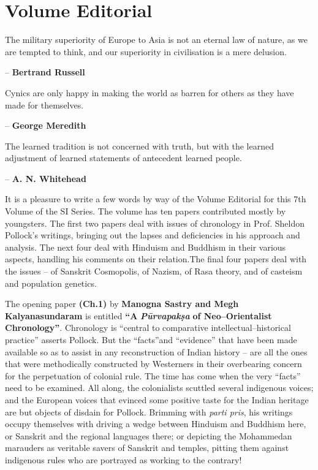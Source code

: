 
\chapter*{Volume Editorial}\label{volumeeditorial}

The military superiority of Europe to Asia is not an eternal law of nature, as we are tempted to think, and our superiority in civilisation is a mere delusion.

\begin{flushright}
– \textbf{Bertrand Russell}
\end{flushright}

Cynics are only happy in making the world as barren for others as they have made for themselves.

\begin{flushright}
– \textbf{George Meredith}
\end{flushright}

The learned tradition is not concerned with truth, but with the learned adjustment of learned statements of antecedent learned people.

\begin{flushright}
– \textbf{A. N. Whitehead}
\end{flushright}

It is a pleasure to write a few words by way of the Volume Editorial for this 7th Volume of the SI Series. The volume has ten papers contributed mostly by youngsters. The first two papers deal with issues of chronology in Prof. Sheldon Pollock’s writings, bringing out the lapses and deficiencies in his approach and analysis. The next four deal with Hinduism and Buddhism in their various aspects, handling his comments on their relation.The final four papers deal with the issues – of Sanskrit Cosmopolis, of Nazism, of Rasa theory, and of casteism and population genetics.

The opening paper \textbf{(Ch.1)} by \textbf{Manogna Sastry and Megh Kalyanasundaram} is entitled \textbf{“A} \textit{\textbf{Pūrvapakṣa}}\textbf{ of Neo–Orientalist Chronology”}. Chronology is “central to comparative intellectual–historical practice” asserts Pollock. But the “facts”and “evidence” that have been made available so as to assist in any reconstruction of Indian history – are all the ones that were methodically constructed by Westerners in their overbearing concern for the perpetuation of colonial rule. The time has come when the very “facts” need to be examined. All along, the colonialists scuttled several indigenous voices; and the European voices that evinced some positive taste for the Indian heritage are but objects of disdain for Pollock. Brimming with\textit{ parti pris}, his writings occupy themselves with driving a wedge between Hinduism and Buddhism here, or Sanskrit and the regional languages there; or depicting the Mohammedan marauders as veritable savers of Sanskrit and temples, pitting them against indigenous rules who are portrayed as working to the contrary!

